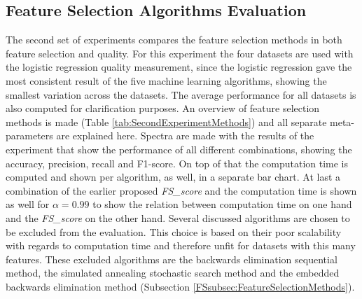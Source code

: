 \documentclass[10pt,a4paper]{report}
\begin{document}
	\subsection{Feature Selection Algorithms Evaluation}
	\label{FSsubsec:FeatureSelectionAlgorithmsEvaluation}
	
	The second set of experiments compares the feature selection methods in both feature selection and quality. For this experiment the four datasets are used with the logistic regression quality measurement, since the logistic regression gave the most consistent result of the five machine learning algorithms, showing the smallest variation across the datasets. The average performance for all datasets is also computed for clarification purposes. An overview of feature selection methods is made (Table \ref{tab:SecondExperimentMethods}) and all separate meta-parameters are explained here.
	Spectra are made with the results of the experiment that show the performance of all different combinations, showing the accuracy, precision, recall and F1-score. On top of that the computation time is computed and shown per algorithm, as well, in a separate bar chart. At last a combination of the earlier proposed \textit{FS\_score} and the computation time is shown as well for $\alpha = 0.99$ to show the relation between computation time on one hand and the \textit{FS\_score} on the other hand. 
	Several discussed algorithms  are chosen to be excluded from the evaluation. This choice is based on their poor scalability with regards to computation time and therefore unfit for datasets with this many features. These excluded algorithms are the backwards elimination sequential method, the simulated annealing stochastic search method and the embedded backwards elimination method (Subsection \ref{FSsubsec:FeatureSelectionMethods}). 
	
\end{document}
